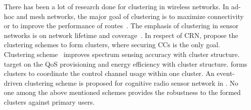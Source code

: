 \documentclass[10pt,journal,compsoc]{IEEEtran}
\theoremstyle{mytheoremstyle}
\theoremstyle{mytheoremstyle}
\theoremstyle{mytheoremstyle}
\newcommand{\ie}{i.e., }
\begin{document}

There has been a lot of research done for clustering in wireless networks.
In ad-hoc and mesh networks, the major goal of clustering is to maximize connectivity or to improve the performance of routes~\cite{Kawadia03, clustering_mesh_globecom2010}.
The emphasis of clustering in sensor networks is on network lifetime and coverage~\cite{Abbasi_survey_07}.
In respect of CRN, \cite{Zhao07, Chen07,Affinity_clustering_09icccn} propose the clustering schemes to form clusters, where securing CCs is the only goal.
Clustering scheme~\cite{Consensus_based_clustering12} improves spectrum sensing accuracy with cluster structure.
\cite{clustering_globecom11, TWC2012_cooperative_communication} target on the QoS provisioning and energy efficiency with cluster structure.
\cite{cluster_EW10} forms clusters to coordinate the control channel usage within one cluster.
An event-driven clustering scheme is proposed for cognitive radio sensor network in \cite{Ozger_cluster_crsn_13}.
No one among the above mentioned schemes provides the robustness to the formed clusters against primary users. 
\end{document}
